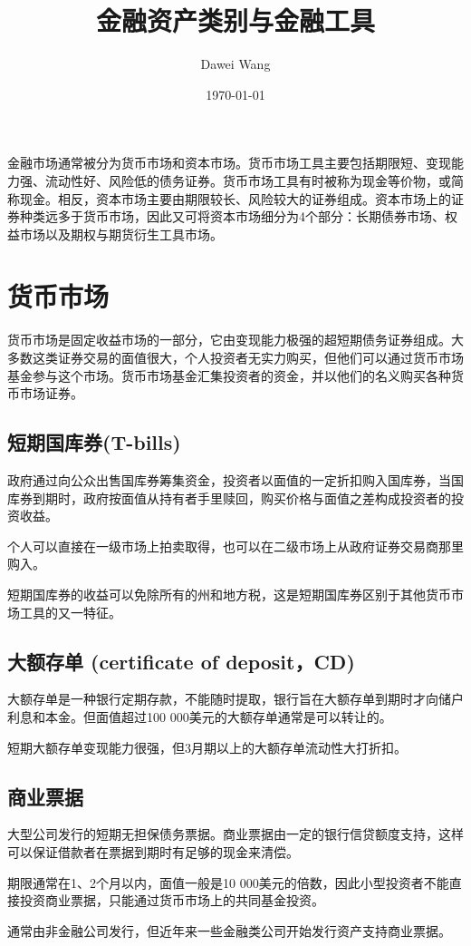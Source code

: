 \documentclass{article}
\title{金融资产类别与金融工具}
\author{Dawei Wang}
\date{\today}
\begin{document}
	\maketitle
金融市场通常被分为货币市场和资本市场。货币市场工具主要包括期限短、变现能力强、流动性好、风险低的债务证券。货币市场工具有时被称为现金等价物，或简称现金。相反，资本市场主要由期限较长、风险较大的证券组成。资本市场上的证券种类远多于货币市场，因此又可将资本市场细分为4个部分：长期债券市场、权益市场以及期权与期货衍生工具市场。
\section{货币市场}
货币市场是固定收益市场的一部分，它由变现能力极强的超短期债务证券组成。大多数这类证券交易的面值很大，个人投资者无实力购买，但他们可以通过货币市场基金参与这个市场。货币市场基金汇集投资者的资金，并以他们的名义购买各种货币市场证券。
\subsection{短期国库券(T-bills)}
政府通过向公众出售国库券筹集资金，投资者以面值的一定折扣购入国库券，当国库券到期时，政府按面值从持有者手里赎回，购买价格与面值之差构成投资者的投资收益。

个人可以直接在一级市场上拍卖取得，也可以在二级市场上从政府证券交易商那里购入。

短期国库券的收益可以免除所有的州和地方税，这是短期国库券区别于其他货币市场工具的又一特征。

\subsection{大额存单 (certificate of deposit，CD)}
大额存单是一种银行定期存款，不能随时提取，银行旨在大额存单到期时才向储户利息和本金。但面值超过100 000美元的大额存单通常是可以转让的。

短期大额存单变现能力很强，但3月期以上的大额存单流动性大打折扣。

\subsection{商业票据}
大型公司发行的短期无担保债务票据。商业票据由一定的银行信贷额度支持，这样可以保证借款者在票据到期时有足够的现金来清偿。

期限通常在1、2个月以内，面值一般是10 000美元的倍数，因此小型投资者不能直接投资商业票据，只能通过货币市场上的共同基金投资。

通常由非金融公司发行，但近年来一些金融类公司开始发行资产支持商业票据。
\end{document}
